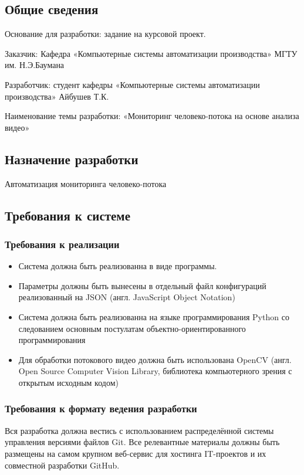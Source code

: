 \documentclass[12pt]{article}
\begin{document}
	\subsection{Общие сведения }
	
	Основание для разработки: задание на курсовой проект.
	
	Заказчик: Кафедра «Компьютерные системы автоматизации производства» МГТУ им. Н.Э.Баумана
	
	Разработчик: студент кафедры «Компьютерные системы автоматизации производства»  Айбушев Т.К.
	
	Наименование темы разработки: «Мониторинг человеко-потока на основе анализа видео»
	
	\subsection{Назначение разработки} 
	Автоматизация мониторинга человеко-потока 
	\subsection{Требования к системе }
		\subsubsection{Требования к реализации}
		\begin{itemize}
		\item Система должна быть  реализованна в виде программы.
		\item Параметры должны быть вынесены в отдельный файл конфигураций реализованный на JSON (англ. JavaScript Object Notation)
		\item Система должна быть реализованна на языке программирования Python со следованием основным постулатам объектно-ориентированного программирования
 		\item Для обработки потокового видео должна быть использована OpenCV (англ. Open Source Computer Vision Library, библиотека компьютерного зрения с открытым исходным кодом) 
		\end{itemize}
 
		\subsubsection{Требования к формату ведения разработки}
Вся разработка должна вестись с использованием распределённой системы управления версиями файлов Git. Все релевантные материалы должны быть размещены на самом крупном веб-сервис для хостинга IT-проектов и их совместной разработки GitHub.
\end{document}
